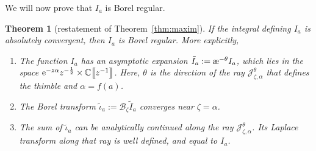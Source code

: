 \documentclass[10pt,a4paper]{amsart}
\newcommand{\C}{\mathbb{C}}
\newcommand{\series}[1]{\tilde{#1}}
\newcommand{\borel}{\mathcal{B}}
\newcommand{\aexp}{\text{\rm \ae}}
\numberwithin{equation}{section}
\newtheorem{Theorem}{Theorem}[section]
\begin{document}
We will now prove that $I_a$ is Borel regular.
\begin{Theorem}[restatement of Theorem~\ref{thm:maxim}]\label{thm:maxim-proof}
If the integral defining $I_a$ is absolutely convergent, then $I_a$ is Borel regular. More explicitly,
\begin{enumerate}\itemsep=0pt
\item[$(1)$] %
The function $I_a$ has an asymptotic expansion $\series{I}_a := \aexp^{-\theta} I_a$, which lies in the space ${\rm e}^{-z \alpha} z^{-\frac{1}{2}}\allowbreak\times \C\big\llbracket z^{-1}\big\rrbracket$. Here, $\theta$ is the direction of the ray $\mathcal{J}^\theta_{\zeta, \alpha}$ that defines the thimble and $\alpha=f(a)$.
\item[$(2)$] %
The Borel transform $\series{\iota}_a := \borel_\zeta \series{I}_a$ converges near $\zeta = \alpha$.
\item[$(3)$] %
The sum of $\series{\iota}_a$ can be analytically continued along the ray $\mathcal{J}_{\zeta, \alpha}^\theta$. Its Laplace transform along that ray is well defined, and equal to $I_a$.
\end{enumerate}
\end{Theorem}
\end{document}
